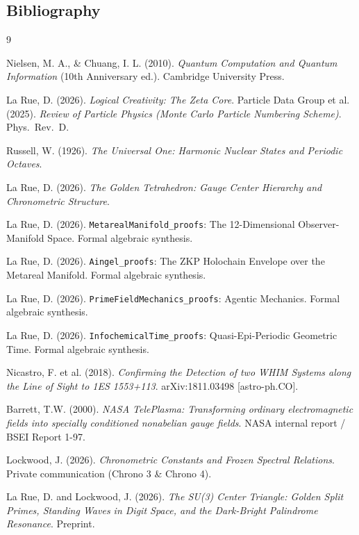 \subsection{Bibliography}
\begin{thebibliography}{9}

Nielsen, M. A., \& Chuang, I. L. (2010).
\textit{Quantum Computation and Quantum Information} (10th Anniversary ed.). Cambridge University Press.

La Rue, D. (2026).
\textit{Logical Creativity: The Zeta Core}.
Particle Data Group et al. (2025).
\textit{Review of Particle Physics (Monte Carlo Particle Numbering Scheme)}.
Phys.~Rev.~D.

Russell, W. (1926).
\textit{The Universal One: Harmonic Nuclear States and Periodic Octaves}.

La Rue, D. (2026).
\textit{The Golden Tetrahedron: Gauge Center Hierarchy and Chronometric Structure}.

La Rue, D. (2026).
\texttt{MetarealManifold\_proofs}: The 12-Dimensional Observer-Manifold Space.
Formal algebraic synthesis.

La Rue, D. (2026).
\texttt{Aingel\_proofs}: The ZKP Holochain Envelope over the Metareal Manifold.
Formal algebraic synthesis.

La Rue, D. (2026).
\texttt{PrimeFieldMechanics\_proofs}: Agentic Mechanics.
Formal algebraic synthesis.

La Rue, D. (2026).
\texttt{InfochemicalTime\_proofs}: Quasi-Epi-Periodic Geometric Time.
Formal algebraic synthesis.

Nicastro, F. et al. (2018).
\textit{Confirming the Detection of two WHIM Systems along the Line of Sight to 1ES 1553+113}.
arXiv:1811.03498 [astro-ph.CO].

Barrett, T.W. (2000).
\textit{NASA TelePlasma: Transforming ordinary electromagnetic fields into specially conditioned nonabelian gauge fields}.
NASA internal report / BSEI Report 1-97.

Lockwood, J. (2026).
\textit{Chronometric Constants and Frozen Spectral Relations}.
Private communication (Chrono 3 \& Chrono 4).

La Rue, D. and Lockwood, J. (2026).
\textit{The SU(3) Center Triangle: Golden Split Primes, Standing Waves in Digit Space, and the Dark-Bright Palindrome Resonance}.
Preprint.


\end{thebibliography}
